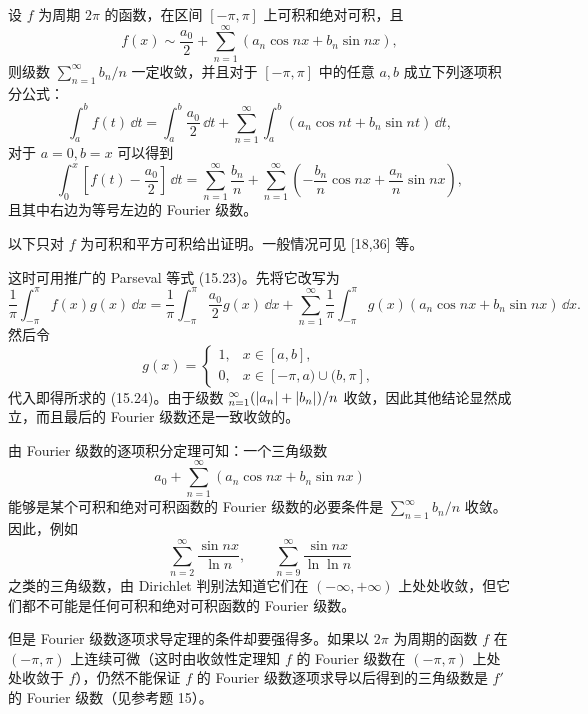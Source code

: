 \begin{xproposition}
设 $f$ 为周期 $2\pi$ 的函数，在区间 $[-\pi,\pi]$ 上可积和绝对可积，且
\[
  f(x)\sim\frac{a_0}{2}+\sum_{n=1}^{\infty}(a_n\cos nx+b_n\sin nx),
\]
则级数 $\sum_{n=1}^{\infty}b_n/n$ 一定收敛，并且对于 $[-\pi,\pi]$ 中的任意 $a,b$ 成立下列逐项积分公式：
\begin{equation}
  \int_a^b f(t)\,\dd t
  =\int_a^b\frac{a_0}{2}\,\dd t
   +\sum_{n=1}^{\infty}\int_a^b(a_n\cos nt+b_n\sin nt)\,\dd t,
  \tag{15.24}
  \label{eq:15.24}
\end{equation}
对于 $a=0,b=x$ 可以得到
\begin{equation}
  \int_0^x\left[f(t)-\frac{a_0}{2}\right]\,\dd t
  =\sum_{n=1}^{\infty}\frac{b_n}{n}
   +\sum_{n=1}^{\infty}\left(-\frac{b_n}{n}\cos nx+\frac{a_n}{n}\sin nx\right),
  \tag{15.25}
  \label{eq:15.25}
\end{equation}
且其中右边为等号左边的 Fourier 级数。
\end{xproposition}

\begin{xproof}
以下只对 $f$ 为可积和平方可积给出证明。一般情况可见 [18,36] 等。

这时可用推广的 Parseval 等式 (15.23)。先将它改写为
\[
  \frac1\pi\int_{-\pi}^{\pi}f(x)g(x)\,\dd x
  =\frac1\pi\int_{-\pi}^{\pi}\frac{a_0}{2}g(x)\,\dd x
   +\sum_{n=1}^{\infty}\frac1\pi\int_{-\pi}^{\pi}g(x)(a_n\cos nx+b_n\sin nx)\,\dd x.
\]
然后令
\[
  g(x)=\begin{cases}
    1,&x\in[a,b],\\
    0,&x\in[-\pi,a)\cup(b,\pi],
  \end{cases}
\]
代入即得所求的 (15.24)。由于级数 $\relax_{n=1}^{\infty}(\lvert a_n\rvert+\lvert b_n\rvert)/n$ 收敛，因此其他结论显然成立，而且最后的 Fourier 级数还是一致收敛的。
\end{xproof}

\begin{xremark}
由 Fourier 级数的逐项积分定理可知：一个三角级数
\[
  a_0+\sum_{n=1}^{\infty}(a_n\cos nx+b_n\sin nx)
\]
能够是某个可积和绝对可积函数的 Fourier 级数的必要条件是 $\sum_{n=1}^{\infty}b_n/n$ 收敛。因此，例如
\[
  \sum_{n=2}^{\infty}\frac{\sin nx}{\ln n},\qquad
  \sum_{n=9}^{\infty}\frac{\sin nx}{\ln\ln n}
\]
之类的三角级数，由 Dirichlet 判别法知道它们在 $(-\infty,+\infty)$ 上处处收敛，但它们都不可能是任何可积和绝对可积函数的 Fourier 级数。
\end{xremark}

但是 Fourier 级数逐项求导定理的条件却要强得多。如果以 $2\pi$ 为周期的函数 $f$ 在 $(-\pi,\pi)$ 上连续可微（这时由收敛性定理知 $f$ 的 Fourier 级数在 $(-\pi,\pi)$ 上处处收敛于 $f$），仍然不能保证 $f$ 的 Fourier 级数逐项求导以后得到的三角级数是 $f'$ 的 Fourier 级数（见参考题 15）。

